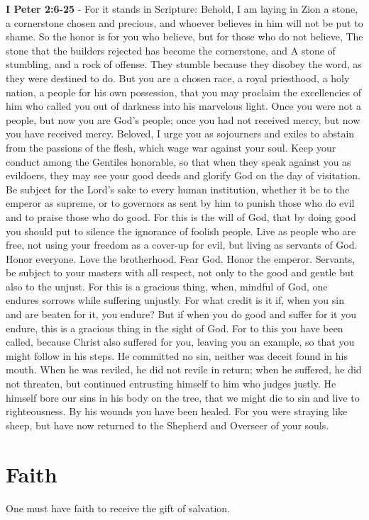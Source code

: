 \documentclass[11pt]{article}
\begin{document}
\textbf{I Peter 2:6-25} - For it stands in Scripture: Behold, I am laying in Zion a stone, a cornerstone chosen and precious, and whoever believes in him will not be put to shame.  So the honor is for you who believe, but for those who do not believe, The stone that the builders rejected has become the cornerstone, and A stone of stumbling, and a rock of offense. They stumble because they disobey the word, as they were destined to do.  But you are a chosen race, a royal priesthood, a holy nation, a people for his own possession, that you may proclaim the excellencies of him who called you out of darkness into his marvelous light.  Once you were not a people, but now you are God's people; once you had not received mercy, but now you have received mercy.  Beloved, I urge you as sojourners and exiles to abstain from the passions of the flesh, which wage war against your soul.  Keep your conduct among the Gentiles honorable, so that when they speak against you as evildoers, they may see your good deeds and glorify God on the day of visitation.  Be subject for the Lord's sake to every human institution, whether it be to the emperor as supreme, or to governors as sent by him to punish those who do evil and to praise those who do good.  For this is the will of God, that by doing good you should put to silence the ignorance of foolish people.  Live as people who are free, not using your freedom as a cover-up for evil, but living as servants of God.  Honor everyone. Love the brotherhood. Fear God. Honor the emperor.  Servants, be subject to your masters with all respect, not only to the good and gentle but also to the unjust.  For this is a gracious thing, when, mindful of God, one endures sorrows while suffering unjustly.  For what credit is it if, when you sin and are beaten for it, you endure? But if when you do good and suffer for it you endure, this is a gracious thing in the sight of God.  For to this you have been called, because Christ also suffered for you, leaving you an example, so that you might follow in his steps.  He committed no sin, neither was deceit found in his mouth.  When he was reviled, he did not revile in return; when he suffered, he did not threaten, but continued entrusting himself to him who judges justly.  He himself bore our sins in his body on the tree, that we might die to sin and live to righteousness. By his wounds you have been healed.  For you were straying like sheep, but have now returned to the Shepherd and Overseer of your souls.

\section{Faith}
\label{sec:orgc7344e0}
One must have faith to receive the gift of salvation.
\end{document}
